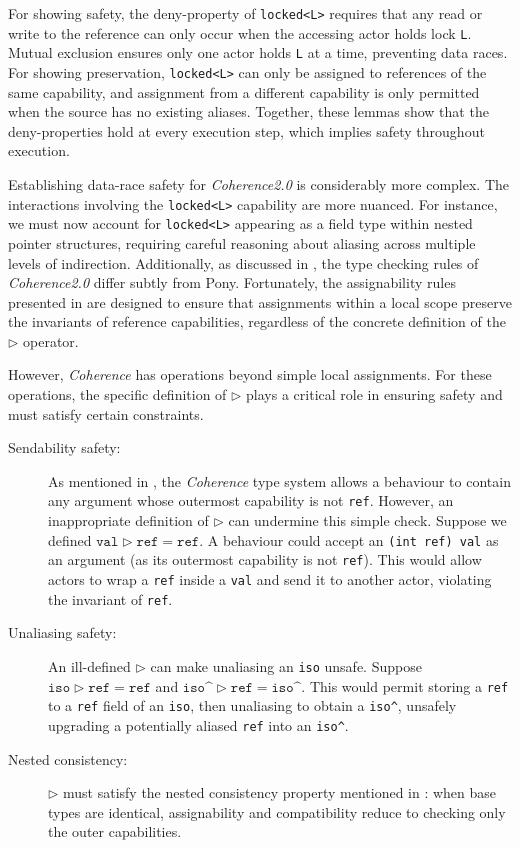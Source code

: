 For showing safety, the deny-property of \texttt{locked<L>} requires that any read or write to the reference can only occur when the accessing actor holds lock \texttt{L}. Mutual exclusion ensures only one actor holds \texttt{L} at a time, preventing data races. For showing preservation, \texttt{locked<L>} can only be assigned to references of the same capability, and assignment from a different capability is only permitted when the source has no existing aliases. Together, these lemmas show that the deny-properties hold at every execution step, which implies safety throughout execution.

Establishing data-race safety for \textit{Coherence2.0} is considerably more complex. The interactions involving the \texttt{locked<L>} capability are more nuanced. For instance, we must now account for \texttt{locked<L>} appearing as a field type within nested pointer structures, requiring careful reasoning about aliasing across multiple levels of indirection. Additionally, as discussed in , the type checking rules of \textit{Coherence2.0} differ subtly from Pony. Fortunately, the assignability rules presented in  are designed to ensure that assignments within a local scope preserve the invariants of reference capabilities, regardless of the concrete definition of the $\triangleright$ operator.

However, \textit{Coherence} has operations beyond simple local assignments. For these operations, the specific definition of $\triangleright$ plays a critical role in ensuring safety and must satisfy certain constraints. 
\begin{description}
  \item[Sendability safety:] As mentioned in , the \textit{Coherence} type system allows a behaviour to contain any argument whose outermost capability is not \texttt{ref}. However, an inappropriate definition of $\triangleright$ can undermine this simple check. Suppose we defined $\texttt{val} \triangleright \texttt{ref} = \texttt{ref}$. A behaviour could accept an \texttt{(int ref) val} as an argument (as its outermost capability is not \texttt{ref}). This would allow actors to wrap a \texttt{ref} inside a \texttt{val} and send it to another actor, violating the invariant of \texttt{ref}.
  \item[Unaliasing safety:] An ill-defined $\triangleright$ can make unaliasing an \texttt{iso} unsafe. Suppose $\texttt{iso} \triangleright \texttt{ref} = \texttt{ref}$ and $\texttt{iso\textasciicircum} \triangleright \texttt{ref} = \texttt{iso\textasciicircum}$. This would permit storing a \texttt{ref} to a \texttt{ref} field of an \texttt{iso}, then unaliasing to obtain a \texttt{iso\textasciicircum}, unsafely upgrading a potentially aliased \texttt{ref} into an \texttt{iso\textasciicircum}.
  \item[Nested consistency:] $\triangleright$ must satisfy the nested consistency property mentioned in : when base types are identical, assignability and compatibility reduce to checking only the outer capabilities.
\end{description}

